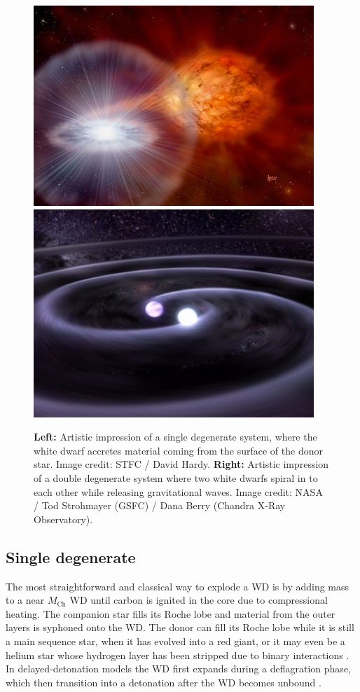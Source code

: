 \documentclass[a4paper,oneside,12pt, class=Latex/Classes/PhDthesisPSnPDF, crop=false]{standalone}
\begin{document}
\begin{figure}
    \centering
    \includegraphics[height=0.229\textheight]{../Images/chapter_1/single_deg.jpeg}
    \includegraphics[height=0.229\textheight]{../Images/chapter_1/double_deg.jpeg}
    \caption{\textbf{Left:} Artistic impression of a single degenerate system, where the white dwarf accretes material coming from the surface of the donor star. Image credit: STFC / David Hardy. \textbf{Right:} Artistic impression of a double degenerate system where two white dwarfs spiral in to each other while releasing gravitational waves. Image credit: NASA / Tod Strohmayer (GSFC) / Dana Berry (Chandra X-Ray Observatory).}
    \label{single_double_deg_mods}
\end{figure}


\subsection{Single degenerate}
The most straightforward and classical way to explode a WD is by adding mass to a near $M_\text{Ch}$ WD until carbon is ignited in the core due to compressional heating. The companion star fills its Roche lobe and material from the outer layers is syphoned onto the WD. The donor can fill its Roche lobe while it is still a main sequence star, when it has evolved into a red giant, or it may even be a helium star whose hydrogen layer has been stripped due to binary interactions \citep{Whelan_classical_Ia_mod, Nomoto_single_degenerate}. In delayed-detonation models the WD first expands during a deflagration phase, which then transition into a detonation after the WD becomes unbound \citep{Kholov_Del_det, Mazzali_common_mechanism}.
\end{document}

